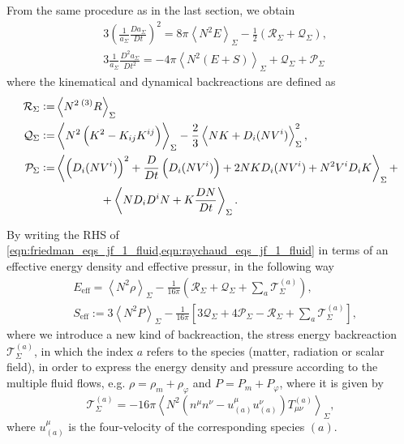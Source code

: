 From the same procedure as in the last section, we obtain
\begin{align}
    &3\left(\frac{1}{a_\Sigma}\frac{Da_\Sigma}{Dt}\right)^2=8\pi\left\langle N^2E\right\rangle_{\Sigma}-\frac{1}{2}\left(\mathcal{R}_\Sigma+\mathcal{Q}_{\Sigma}\right),\label{eqn:friedman_eqs_jf_1_fluid}\\
    &3\frac{1}{a_{\Sigma}}\frac{D^2a_{\Sigma}}{Dt^2}=-4\pi\left\langle N^2(E+S)\right\rangle_{\Sigma}+\mathcal{Q}_{\Sigma}+\mathcal{P}_{\Sigma}\label{eqn:raychaud_eqs_jf_1_fluid}
\end{align}
where the kinematical and dynamical backreactions are defined as
\begin{align}
    \mathcal{R}_\Sigma :=&\left\langle N^2 \prescript{(3)}{}{R}\right\rangle_{\Sigma}\\
    \mathcal{Q}_{\Sigma}:=& \left\langle N^2\left(K^2-K_{ij}K^{ij}\right)\right\rangle_{\Sigma}-\frac{2}{3}\left\langle NK+D_i(NV^i)\right\rangle_{\Sigma}^2, \\
    \mathcal{P}_{\Sigma}:= &\left\langle \left(D_i(NV^i)\right)^2 + \frac{D}{Dt}\left(D_i(NV^i)\right)+2NKD_i(NV^i)+N^2V^iD_i K\right\rangle_\Sigma+ \\
    &\qquad\qquad+ \left\langle N D_i D^i N+K\frac{DN}{Dt}\right\rangle_{\Sigma}.
\end{align}


By writing the RHS of \cref{eqn:friedman_eqs_jf_1_fluid,eqn:raychaud_eqs_jf_1_fluid} in terms of an effective energy density and effective pressur, in the following way
\begin{align}
    &E_{\mathrm{eff}} = \left\langle N^2 \rho\right\rangle_{\Sigma}-\frac{1}{16\pi}\left(\mathcal{R}_\Sigma+\mathcal{Q}_{\Sigma}+\sum_a \mathcal{T}^{(a)}_{\Sigma}\right),\\
    &S_{\mathrm{eff}}:=3\left\langle N^2 P\right\rangle_{\Sigma}-\frac{1}{16\pi}\left[3\mathcal{Q}_{\Sigma}+4\mathcal{P}_{\Sigma}-\mathcal{R}_\Sigma+\sum_a\mathcal{T}^{(a)}_{\Sigma}\right],
\end{align}
where we introduce a new kind of backreaction, the stress energy backreaction $\mathcal{T}^{(a)}_\Sigma$, in which the index $a$ refers to the species (matter, radiation or scalar field), in order to express the energy density and pressure according to the multiple fluid flows, e.g. $\rho=\rho_m+\rho_\varphi$ and $P=P_m+P_\varphi$, where it is given by
\begin{equation}
    \mathcal{T}^{(a)}_{\Sigma}=-16\pi\left\langle N^2\left(n^\mu n^\nu-u^\mu_{(a)} u^\nu_{(a)}\right)T_{\mu\nu}^{(a)}\right\rangle_\Sigma,
\end{equation}
where $u_{(a)}^\mu$ is the four-velocity of the corresponding species $(a)$.

